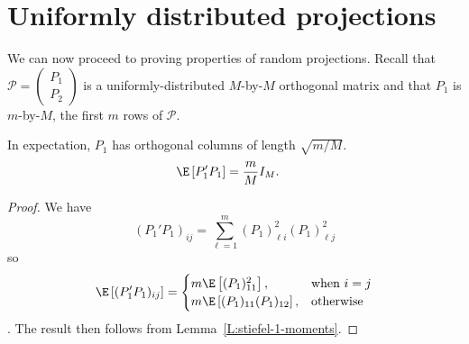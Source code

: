 \section{Uniformly distributed projections}

We can now proceed to proving properties of random projections.  Recall that
$\mathcal{P} = \left( \begin{smallmatrix} P_1 \\ P_2 \end{smallmatrix} \right)$ is a uniformly-distributed $M$-by-$M$ orthogonal matrix and that $P_1$ is
$m$-by-$M$, the first $m$ rows of $\mathcal{P}$.

\begin{lemma}\label{L:projection-m1}
    In expectation, $P_1$ has orthogonal columns of length $\sqrt{m/M}$.
    \begin{align*}
        \E \left[ P_1' P_1 \right] &= \frac{m}{M} I_M.
    \end{align*}
\end{lemma}
\begin{proof}
    We have
    \[
        (P_1' P_1)_{ij} 
        =
        \sum_{\ell=1}^m (P_1)_{\ell i}^2 (P_1)_{\ell j}^2
    \]
    so
    \[
        \E \left[ (P_1' P_1)_{ij} \right] 
        =
        \begin{cases}
            m \E \left[ (P_1)_{11}^2 \right], &\text{when $i = j$} \\
            m \E \left[ (P_1)_{11} (P_1)_{12} \right], &\text{otherwise}
        \end{cases}
    \].
    The result then follows from Lemma~\ref{L:stiefel-1-moments}.
\end{proof}

